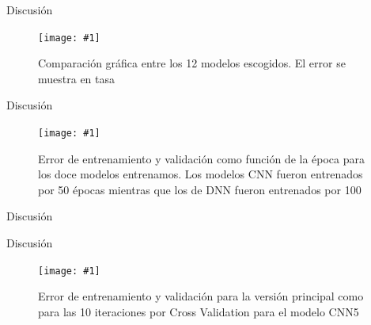 \documentclass[notheorems]{beamer}
\newcommand{\figura}[3]{\begin{figure}[H] \centering \texttt{[image: \#1]} \caption{#2} \label{#1}  \end{figure}}
\begin{document}
\begin{frame}{Discusión}
    \figura{modelsPlot.pdf}{Comparación gráfica entre los 12 modelos escogidos. El error se muestra en tasa}{width = 0.8\textwidth}
\end{frame}
\begin{frame}{Discusión}
    \figura{modelsGrid.pdf}{Error de entrenamiento y validación como función de la época para los doce modelos entrenamos. Los modelos CNN fueron entrenados por 50 épocas mientras que los de DNN fueron entrenados por 100}{height=0.7\textheight}
\end{frame}
\begin{frame}{Discusión}
    \begin{table}[h!]
            \caption{Comparación entre el modelo CNN5 y el modelo de regresión logística}
        \label{tab:finalCompar}
    \end{table}
\end{frame}
\begin{frame}{Discusión}
    \figura{crossValGrid.pdf}{Error de entrenamiento y validación para la versión principal como para las 10 iteraciones por Cross Validation para el modelo CNN5}{height=0.7\textheight}
\end{frame}
\end{document}

